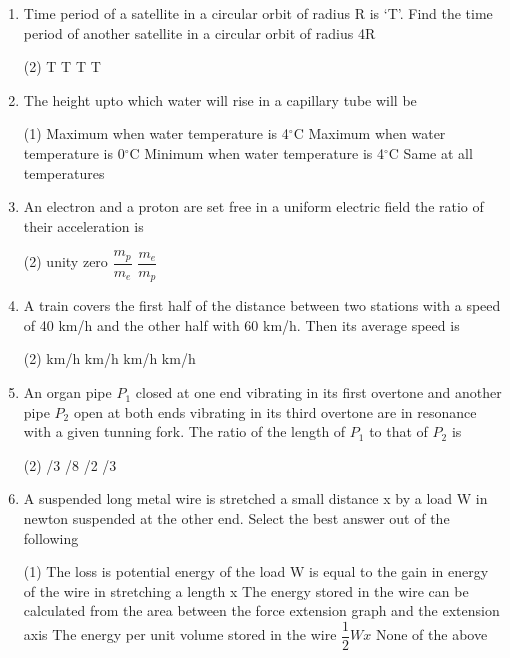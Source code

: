 \documentclass[twocolumn]{article}
\renewcommand{\frac}[2]{\dfrac{#1}{#2}}
\begin{document}
\begin{enumerate}
    \item Time period of a satellite in a circular orbit of radius R is `T'. Find the time period of another satellite in a circular orbit of radius 4R
    \begin{tasks}(2)
        \task T
         T
         T
         T
    \end{tasks}

    \item The height upto which water will rise in a capillary tube will be
    \begin{tasks}(1)
        \task Maximum when water temperature is 4$^\circ$C
        \task Maximum when water temperature is 0$^\circ$C
        \task Minimum when water temperature is 4$^\circ$C
        \task Same at all temperatures
    \end{tasks}

    \item An electron and a proton are set free in a uniform electric field the ratio of their acceleration is
    \begin{tasks}(2)
        \task unity
        \task zero
        \task $\frac{m_p}{m_e}$
        \task $\frac{m_e}{m_p}$
    \end{tasks}

    \item A train covers the first half of the distance between two stations with a speed of 40 km/h and the other half with 60 km/h. Then its average speed is
    \begin{tasks}(2)
         km/h
         km/h
         km/h
         km/h
    \end{tasks}

    \item An organ pipe $P_1$ closed at one end vibrating in its first overtone and another pipe $P_2$ open at both ends vibrating in its third overtone are in resonance with a given tunning fork. The ratio of the length of $P_1$ to that of $P_2$ is
    \begin{tasks}(2)
        /3
        /8
        /2
        /3
    \end{tasks}

    \item A suspended long metal wire is stretched a small distance x by a load W in newton suspended at the other end. Select the best answer out of the following
    \begin{tasks}(1)
        \task The loss is potential energy of the load W is equal to the gain in energy of the wire in stretching a length x
        \task The energy stored in the wire can be calculated from the area between the force extension graph and the extension axis
        \task The energy per unit volume stored in the wire $\frac{1}{2} Wx$
        \task None of the above
    \end{tasks}


\end{enumerate}
\end{document}
